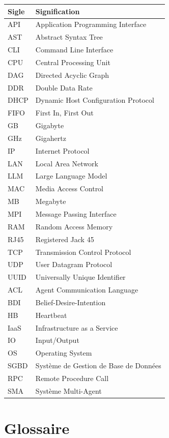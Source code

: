 \documentclass[12pt,a4paper]{report}
\begin{document}
\begin{table}[H]
\centering
\begin{tabular}{ll}
\toprule
\textbf{Sigle} & \textbf{Signification} \\
\midrule
API & Application Programming Interface \\
AST & Abstract Syntax Tree \\
CLI & Command Line Interface \\
CPU & Central Processing Unit \\
DAG & Directed Acyclic Graph \\
DDR & Double Data Rate \\
DHCP & Dynamic Host Configuration Protocol \\
FIFO & First In, First Out \\
GB & Gigabyte \\
GHz & Gigahertz \\
IP & Internet Protocol \\
LAN & Local Area Network \\
LLM & Large Language Model \\
MAC & Media Access Control \\
MB & Megabyte \\
MPI & Message Passing Interface \\
RAM & Random Access Memory \\
RJ45 & Registered Jack 45 \\
TCP & Transmission Control Protocol \\
UDP & User Datagram Protocol \\
UUID & Universally Unique Identifier \\
ACL & Agent Communication Language \\
BDI & Belief-Desire-Intention \\
HB & Heartbeat \\
IaaS & Infrastructure as a Service \\
IO & Input/Output \\
OS & Operating System \\
SGBD & Système de Gestion de Base de Données \\
RPC & Remote Procedure Call \\
SMA & Système Multi-Agent \\
\bottomrule
\end{tabular}
\end{table}

\chapter*{Glossaire}
\end{document}
